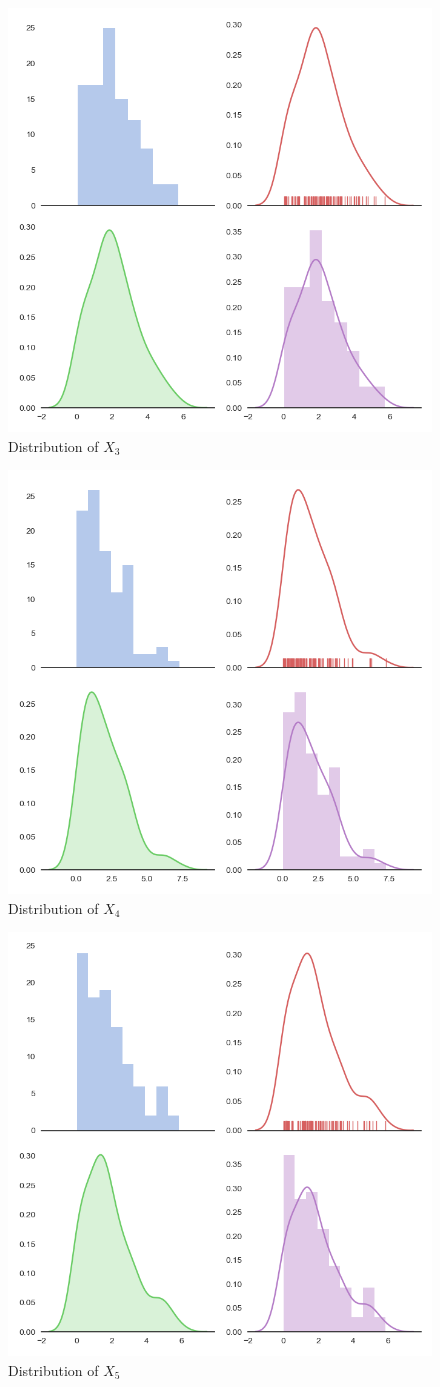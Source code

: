 \documentclass[10pt,journal]{IEEEtran}
\begin{document}
\begin{figure}[!ht]
	\centering
	\includegraphics[width=0.7\columnwidth,height=0.6\linewidth]{output_3.png}
	\caption{Distribution of \(X_3\)}
\end{figure}
\begin{figure}[!ht]
	\centering
	\includegraphics[width=0.7\columnwidth,height=0.6\linewidth]{output_4.png}
	\caption{Distribution of \(X_4\)}
\end{figure}
\pagebreak
\begin{figure}[!ht]
	\centering
	\includegraphics[width=0.7\columnwidth,height=0.6\linewidth]{output_5.png}
	\caption{Distribution of \(X_5\)}
\end{figure}
\end{document}
